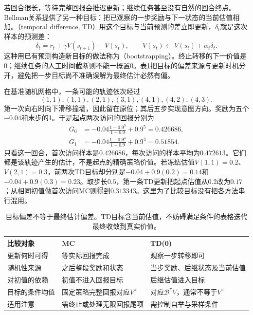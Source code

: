若回合很长，等待完整回报会推迟更新；继续任务甚至没有自然的回合终点。Bellman关系提供了另一种目标：把已观察的一步奖励与下一状态的当前估值相加。（temporal difference, TD）用这个目标与当前预测的差立即更新，$\delta_t$就是这次样本的预测差：
\begin{equation}
  \delta_t=r_t+\gamma V(s_{t+1})-V(s_t),\qquad
  V(s_t)\leftarrow V(s_t)+\alpha_t\delta_t .
  \label{eq:rl-learning-td-zero}
\end{equation}
这种用已有预测构造新目标的做法称为（bootstrapping）。终止转移的下一价值是0；继续任务的人工时间截断则不能一概置0。表\ref{tab:rl-learning-mc-td}把目标的偏差来源与更新时机分开，避免把一步目标尚不准确误解为最终估计必然有偏。

\begin{example}[同一终止轨迹上的不同目标]
  \label{ex:rl-learning-mc-td}
  在基准随机网格中，一条可能的轨迹依次经过
  \[
    (1,1),(1,1),(2,1),(3,1),(4,1),(4,2),(4,3).
  \]
  第一次向右时向下滑移撞墙，因此留在原位；其后五步实现意图方向。奖励为五个$-0.04$和末步的1。于是起点两次访问的回报分别为
  \[
    \begin{aligned}
      G_0&=-0.04\frac{1-0.9^5}{1-0.9}+0.9^5=0.426686,\\
      G_1&=-0.04\frac{1-0.9^4}{1-0.9}+0.9^4=0.51854.
    \end{aligned}
  \]
  只看这一回合，首次访问样本是$0.426686$，每次访问的样本平均为$0.472613$。它们都是该轨迹产生的估计，不是起点的精确策略价值。若冻结估值$V(1,1)=0.2$、$V(2,1)=0.3$，前两次TD目标却分别是$-0.04+0.9(0.2)=0.14$和$-0.04+0.9(0.3)=0.23$。取步长$0.5$，第一条TD更新把起点估值从$0.2$改为$0.17$；从相同初值做首次访问MC则得到$0.313343$。这里为了比较目标没有把各方法串行混用。
\end{example}

\begin{table}[htbp]
  \centering
  \small
  \begin{tabularx}{\linewidth}{>{\raggedright\arraybackslash}p{22mm} >{\raggedright\arraybackslash}X >{\raggedright\arraybackslash}X}
    \toprule
    比较对象 & MC & TD(0) \\
    \midrule
    更新何时可得 & 等实际回报完成 & 观察一步转移即可 \\
    随机性来源 & 之后整段奖励和状态 & 当步奖励、后继状态及当前估值 \\
    对初值的依赖 & 初值不进入回报目标 & 后继估值进入目标 \\
    目标的条件均值 & 固定策略完整回报对应$V^\pi$ & 对应$\mathcal B^\pi V$，通常不等于$V^\pi$ \\
    适用注意 & 需终止或处理无限回报尾项 & 需控制自举与采样条件 \\
    \bottomrule
  \end{tabularx}
  \caption{目标偏差不等于最终估计偏差。TD目标含当前估值，不妨碍满足条件的表格迭代最终收敛到真实价值。}
  \label{tab:rl-learning-mc-td}
\end{table}

